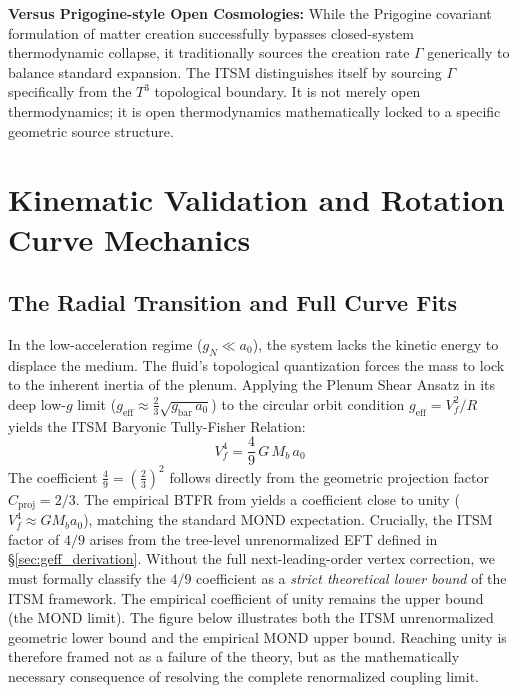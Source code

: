 \documentclass[aps,prd,10pt,twocolumn,superscriptaddress,nofootinbib,floatfix]{revtex4-2}
\begin{document}
\textbf{Versus Prigogine-style Open Cosmologies:} While the Prigogine covariant formulation of matter creation successfully bypasses closed-system thermodynamic collapse, it traditionally sources the creation rate $\Gamma$ generically to balance standard expansion. The ITSM distinguishes itself by sourcing $\Gamma$ specifically from the $T^3$ topological boundary. It is not merely open thermodynamics; it is open thermodynamics mathematically locked to a specific geometric source structure.

\section{Kinematic Validation and Rotation Curve Mechanics}

\subsection{The Radial Transition and Full Curve Fits}
In the low-acceleration regime ($g_N \ll a_0$), the system lacks the kinetic energy to displace the medium. The fluid's topological quantization forces the mass to lock to the inherent inertia of the plenum. Applying the Plenum Shear Ansatz in its deep low-$g$ limit ($g_{\text{eff}} \approx \frac{2}{3}\sqrt{g_{\text{bar}}\,a_0}$) to the circular orbit condition $g_{\text{eff}} = V_f^2/R$ yields the ITSM Baryonic Tully-Fisher Relation:
\begin{equation}
V_f^4 = \frac{4}{9}\,G\,M_b\,a_0
\end{equation}
The coefficient $\frac{4}{9} = \left(\frac{2}{3}\right)^2$ follows directly from the geometric projection factor $C_{\text{proj}} = 2/3$. The empirical BTFR from \cite{sparc} yields a coefficient close to unity ($V_f^4 \approx G M_b a_0$), matching the standard MOND expectation. Crucially, the ITSM factor of $4/9$ arises from the tree-level unrenormalized EFT defined in \S\ref{sec:geff_derivation}. Without the full next-leading-order vertex correction, we must formally classify the $4/9$ coefficient as a \emph{strict theoretical lower bound} of the ITSM framework. The empirical coefficient of unity remains the upper bound (the MOND limit). The figure below illustrates both the ITSM unrenormalized geometric lower bound and the empirical MOND upper bound. Reaching unity is therefore framed not as a failure of the theory, but as the mathematically necessary consequence of resolving the complete renormalized coupling limit.
\end{document}
